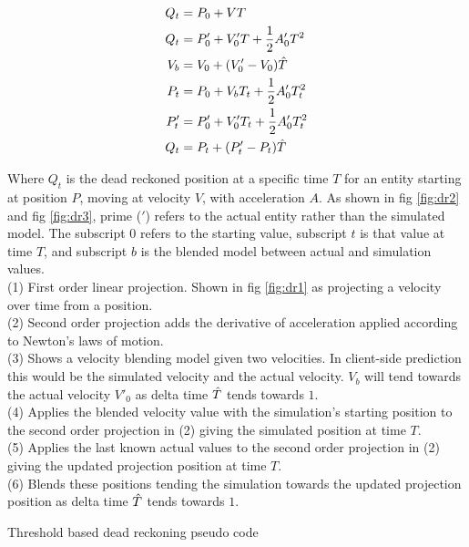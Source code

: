 \documentclass[journal]{IEEEtran}
\begin{document}
\begin{align}
        Q_t & = P_0 + VT \\
        Q_t & = {P'_0} + {V'_0} T + \frac{1}{2} {A'_0} T^2 \\
        V_b & = V_0 + ({V'_0} - {V_0}) \Hat{T}  \\
        P_t & = P_0 + {V_b}{T_t} + \frac{1}{2} {A'_0} {T_t^2}  \\
        P'_t & = {P'_0} + {V'_0}{T_t} + \frac{1}{2}{A'_0}{T_t^2}\\
        Q_t & = P_t + ({P'_t} - P_t ) \Hat{T} 
\end{align}

Where $Q_t$ is the dead reckoned position at a specific time $T$ for an entity starting at position $P$, moving at velocity $V$, with acceleration $A$. As shown in fig \ref{fig:dr2} and fig \ref{fig:dr3}, prime ($'$) refers to the actual entity rather than the simulated model. The subscript $0$ refers to the starting value, subscript $t$ is that value at time $T$, and subscript $b$ is the blended model between actual and simulation values. \\
(1) First order linear projection. Shown in fig \ref{fig:dr1} as projecting a velocity over time from a position.\\
(2) Second order projection adds the derivative of acceleration applied according to Newton's laws of motion.\\
(3) Shows a velocity blending model given two velocities. In client-side prediction this would be the simulated velocity and the actual velocity. $V_b$ will tend towards the actual velocity $V'_0$ as delta time $\Hat{T}$ tends towards $1$. \\
(4) Applies the blended velocity value with the simulation's starting position to the second order projection in (2) giving the simulated position at time $T$.\\
(5) Applies the last known actual values to the second order projection in (2) giving the updated projection position at time $T$.\\
(6) Blends these positions tending the simulation towards the updated projection position as delta time $\Hat{T}$ tends towards $1$. \\

\hrulefill

{\sc Threshold based dead reckoning pseudo code}

\hrulefill
\end{document}
